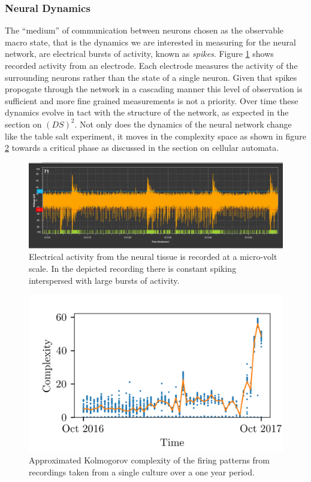 \subsubsection{Neural Dynamics}
The ``medium'' of communication between neurons chosen as the observable macro
state, that is the dynamics we are interested in measuring for the neural
network, are electrical bursts of activity, known as \emph{spikes}.
Figure \ref{figWave} shows recorded activity from an electrode.
Each electrode measures the activity of the surrounding neurons rather than the
state of a single neuron.
Given that spikes propogate through the network in a cascading manner this
level of observation is sufficient and more fine grained measurements is not a
priority.
Over time these dynamics evolve in tact with the structure of the network, as
expected in the section on $(DS)^2$.
Not only does the dynamics of the neural network change like the table salt
experiment, it moves in the complexity space as shown in figure \ref{figDopey} towards
a critical phase as discussed in the section on cellular automata.
%
\begin{figure}[h]
  \centering
  \includegraphics[width=1\textwidth]{fig/PacemakerBurst.png}
  \caption[Reording of a neural spike]{
    Electrical activity from the neural tissue is recorded at a micro-volt
    scale.
    In the depicted recording there is constant spiking interspersed with large
    bursts of activity.
  }
  \label{figWave}
\end{figure}
%
\begin{figure}[h]
  \centering
  \includegraphics[width=1\textwidth]{fig/dopeyComplexity.png}
  \caption[Evolving complexity of a neural culture]{
    Approximated Kolmogorov complexity of the firing patterns from recordings
    taken from a single culture over a one year period.
  }
  \label{figDopey}
\end{figure}
